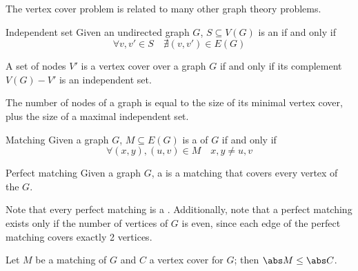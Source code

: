 \documentclass[a4paper, 12pt]{report}
\begin{document}
    The vertex cover problem is related to many other graph theory problems.

    \begin{frameddefn}{Independent set}
        Given an undirected graph $G$, $S \subseteq V(G)$ is an  if and only if $$\forall v, v' \in S \quad \nexists (v, v') \in E(G)$$
    \end{frameddefn}

    \begin{framedthm}{}
        A set of nodes $V'$ is a vertex cover over a graph $G$ if and only if its complement $V(G) - V'$ is an independent set.
    \end{framedthm}


    \begin{framedcor}{}
        The number of nodes of a graph is equal to the size of its minimal vertex cover, plus the size of a maximal independent set.
    \end{framedcor}

    \begin{frameddefn}{Matching}
        Given a graph $G$, $M \subseteq E(G)$ is a  of $G$ if and only if $$\forall (x, y), (u, v) \in M \quad x , y\neq u,v$$
    \end{frameddefn}

    \begin{frameddefn}{Perfect matching}
        Given a graph $G$, a  is a matching that covers every vertex of the $G$.
    \end{frameddefn}

    Note that every perfect matching is a . Additionally, note that a perfect matching exists only if the number of vertices of $G$ is even, since each edge of the perfect matching covers exactly 2 vertices.

    \begin{framedthm}[label={bounded_matching}]{}
        Let $M$ be a matching of $G$ and $C$ a vertex cover for $G$; then $\abs M \le \abs C$.
    \end{framedthm}
\end{document}
